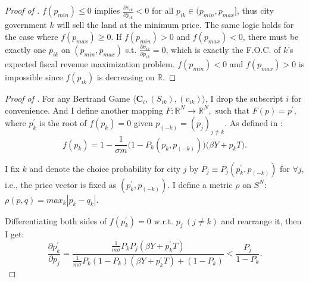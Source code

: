 \begin{proof}[Proof of ]
    $f(p_{min})\leq 0$ implies $\frac{\partial v_{ik}}{\partial p_{ik}} < 0$
    for all $p_{ik} \in (p_{min}, p_{max}]$, thus city government $k$ will sell the land at the
    minimum price. The same logic holds for the case where $f(p_{max}) \geq 0$.
    If $f(p_{min})>0$ and $f(p_{max})<0$,
    there must be exactly one $p_{ik}$
    on $(p_{min}, p_{max})$ s.t. $\frac{\partial v_{ik}}{\partial p_{ik}} = 0$, which is exactly
    the F.O.C. of $k$'s expected fiscal revenue maximization problem.
    $f(p_{min})<0$ and $f(p_{max})>0$ is impossible since $f(p_{ik})$
    is decreasing on $\mathbb{R}$.
\end{proof}


\begin{proof}[Proof of ]
    For any Bertrand Game $\langle \mathbf{C}_{i}, (S_{ik}), (v_{ik}) \rangle$,
    I drop the subscript $i$ for convenience.
    And I define another mapping
    $F: \mathbb{R}^{N} \rightarrow \mathbb{R}^{N}, \text{ such that } F(p) = p^{\prime}$,
    where $p^{\prime}_{k}$ is the root of $f(p_{k}) = 0$ given
    $p_{(-k)} = (p_j)_{j \neq k}$. As defined in :
    $$
        f(p_{k}) = 1 - \frac{1}{\sigma m} \big(1-P_{k}(p_{k}, p_{(-k)})\big)
        \big(\beta Y + p_{k}T \big).
    $$

    I fix $k$ and denote the choice probability for city $j$ by
    $P_j \equiv P_{j}(p^{\prime}_{k}, p_{(-k)})$ for $\forall j$,
    i.e., the price vector is fixed as $(p^{\prime}_{k}, p_{(-k)})$.
    I define a metric $\rho$ on $S^{N}$: $\rho(p, q) = max_{k}|p_k - q_k|$.

    Differentiating both sides of $f(p^{\prime}_{k}) = 0$ w.r.t. $p_j~ (j \neq k)$
    and rearrange it, then I get:
    \[
        \frac{\partial p^{\prime}_k}{\partial p_j} =
        \frac{\frac{1}{m\sigma} P_{k} P_{j} (\beta Y + p^{\prime}_k T)}
        {\frac{1}{m\sigma} P_{k}  (1 - P_{k}) (\beta Y + p^{\prime}_k T) + (1 - P_{k})}
        < \frac{P_j}{1 - P_k}.
    \]


\end{proof}
